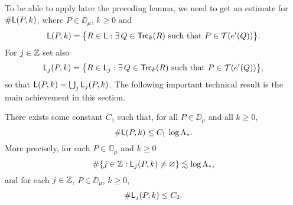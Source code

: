 \vv

To be able to apply later the preceding lemma, we need to get an estimate for $\#{\mathsf{L}}(P,k)$, where $P\in\DD_\mu,\, k\ge 0$ and
\begin{equation*}
	{\mathsf{L}}(P,k)= \big\{R\in{\mathsf{L}}:\exists \,Q\in{\mathsf{Trc}}_k(R) \mbox{ such that } P\in{\mathcal T}(e'(Q))\big\}.
\end{equation*}
For $j\in{\mathbb Z}$ set also 
$${\mathsf{L}}_j(P,k)= \big\{R\in{\mathsf{L}}_j:\exists \,Q\in{\mathsf{Trc}}_k(R) \mbox{ such that } P\in{\mathcal T}(e'(Q))\big\},$$
so that ${\mathsf{L}}(P,k) = \bigcup_j {\mathsf{L}}_j(P,k)$. The following important technical result is the main achievement in this section.

\begin{lemma}\label{lemimp9}
There exists some constant $C_1$ such that, for all $P\in\DD_\mu$ and all $k\geq0$,
$$\#{\mathsf{L}}(P,k)\leq C_1\,\log\Lambda_*.$$
More precisely, for each $P\in\DD_\mu$ and $k\geq0$
\begin{equation}\label{eq:lemimp91}
	\#\{j\in{\mathbb Z}:{\mathsf{L}}_j(P,k)\neq\varnothing\}\lesssim \log\Lambda_*,
\end{equation}
and for each $j\in{\mathbb Z}$, $P\in\DD_\mu$, $k\geq0$,
\begin{equation}\label{eqlj83}
	\#{\mathsf{L}}_j(P,k) \leq C_2.
\end{equation}
\end{lemma}

\vv

